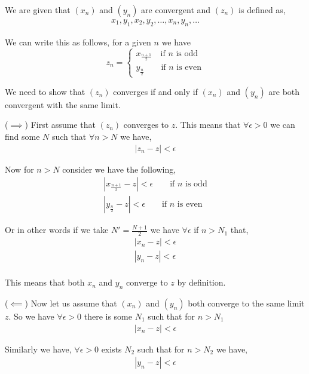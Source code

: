 \documentclass[a4paper]{report}
\begin{document}
We are given that $(x_n)$ and $(y_n)$ are convergent and $(z_n)$ is defined as,
\begin{align*}
	x_{1},y_{1},x_{2},y_{2}, \dots, x_n,y_n,\dots
\end{align*}

We can write this as follows, for a given $n$ we have $$z_n = \begin{cases} x_{\frac{n + 1}{2}} \quad \text{if $n$ is odd} \\ y_{\frac{n}{2}} \qquad \text{if $n$ is even}\end{cases}$$

We need to show that $(z_n)$ converges if and only if $(x_n)$ and $(y_n)$ are both convergent with the same limit.

\vspace{1em} 

($\implies$) First assume that $(z_n)$ converges to $z$. This means that $\forall \epsilon > 0$ we can find some $N$ such that $\forall n > N$ we have, 
\begin{align*}
	\left | z_n - z  \right |< \epsilon
\end{align*}

Now for $n > N$ consider we have the following,
\begin{align*}
	\left |   x_{\frac{n + 1}{2}} - z\right | < \epsilon \qquad \text{if $n$ is odd}\\
	\left |   y_{\frac{n}{2}} - z\right | < \epsilon \qquad  \text{if $n$ is even}
\end{align*}

Or in other words if we take $N' = \frac{N + 1}{2}$ we have $\forall \epsilon$ if  $n > N_{1}$ that,
\begin{align*}
	\left |x_n  - z  \right | < \epsilon\\
	\left |y_n  - z  \right | < \epsilon\\
\end{align*}	

This means that both $x_n$ and $y_n$ converge to $z$ by definition.

\vspace{1em}


($\impliedby$) Now let us assume that $(x_n)$ and $(y_n)$ both converge to the same limit $z$. So we have $\forall \epsilon > 0$ there is some $N_{1}$ such that for $n > N_{1}$
\begin{align*}
	\left | x_n - z \right | < \epsilon
\end{align*}

Similarly we have, $\forall \epsilon > 0$ exists $N_{2}$ such that for $n > N_{2}$ we have,
\begin{align*}
	\left | y_n - z \right | < \epsilon
\end{align*}
\end{document}

